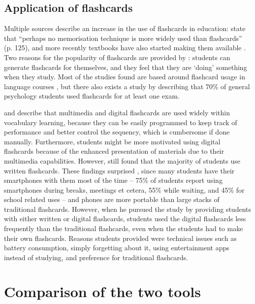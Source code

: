 \subsection{Application of flashcards}

\label{subsec:fcapplication}

Multiple sources describe an increase in the use of flashcards in education:  state that ``perhaps no memorisation technique is more widely used than flashcards'' (p. 125), and more recently textbooks have also started making them available \cite{burgess, golding}. Two reasons for the popularity of flashcards are provided by : students can generate flashcards for themselves, and they feel that they are `doing' something when they study. Most of the studies found are based around flashcard usage in language courses \cite{nakata, joseph, chien}, but there also exists a study by  describing that 70\% of general psychology students used flashcards for at least one exam.

 and  describe that multimedia and digital flashcards are used widely within vocabulary learning, because they can be easily programmed to keep track of performance and better control the sequency, which is cumbersome if done manually. Furthermore, students might be more motivated using digital flashcards because of the enhanced presentation of materials due to their multimedia capabilities. However,  still found that the majority of students use written flashcards. These findings surprised , since many students have their smartphones with them most of the time -- 75\% of students report using smartphones during breaks, meetings et cetera, 55\% while waiting, and 45\% for school related uses -- and phones are more portable than large stacks of traditional flashcards. However, when he pursued the study by providing students with either written or digital flashcards, students used the digital flashcards less frequently than the traditional flashcards, even when the students had to make their own flashcards. Reasons students provided were technical issues such as battery consumption, simply forgetting about it, using entertainment apps instead of studying, and preference for traditional flashcards.

\section{Comparison of the two tools}
\label{sec:comparison}

